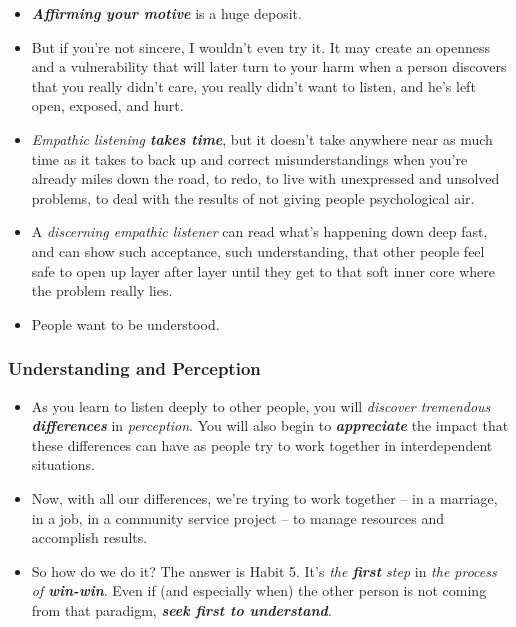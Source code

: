 \documentclass[11pt]{article}
\begin{document}
\begin{itemize}
\item \emph{\textbf{Affirming your motive}} is a huge deposit.

\item But if you're not sincere, I wouldn't even try it. It may create an openness and a vulnerability that will later turn to your harm when a person discovers that you really didn't care, you really didn't want to listen, and he's left open, exposed, and hurt.

\item \emph{Empathic listening \textbf{takes time}}, but it doesn't take anywhere near as much time as it takes to back up and correct misunderstandings when you're already miles down the road, to redo, to live with unexpressed and unsolved problems, to deal with the results of not giving people psychological air.

\item A \emph{discerning empathic listener} can read what's happening down deep fast, and can show such acceptance, such understanding, that other people feel safe to open up layer after layer until they get to that soft inner core where the problem really lies.

\item People want to be understood.
\end{itemize}
\subsubsection{Understanding and Perception}
\begin{itemize}
\item As you learn to listen deeply to other people, you will \emph{discover tremendous \textbf{differences}} in \emph{perception}. You will also begin to \emph{\textbf{appreciate}} the impact that these differences can have as people try to work together in interdependent situations.

\item Now, with all our differences, we're trying to work together -- in a marriage, in a job, in a community service project -- to manage resources and accomplish results. 

\item So how do we do it? The answer is Habit 5. It's \emph{the \textbf{first} step} in \emph{the process of \textbf{win-win}}. Even if (and especially when) the other person is not coming from that paradigm, \emph{\textbf{seek first to understand}}.
\end{itemize}
\end{document}
